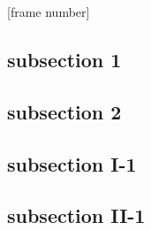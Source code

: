 \documentclass[aspectratio=169]{beamer}
\begin{document}
\Front
\overview
{}[frame number]
\subsection{subsection 1}

\subsection{subsection 2}

\subsection{subsection I-1}


\subsection{subsection II-1}

\pagestyle{empty}

\end{document}
